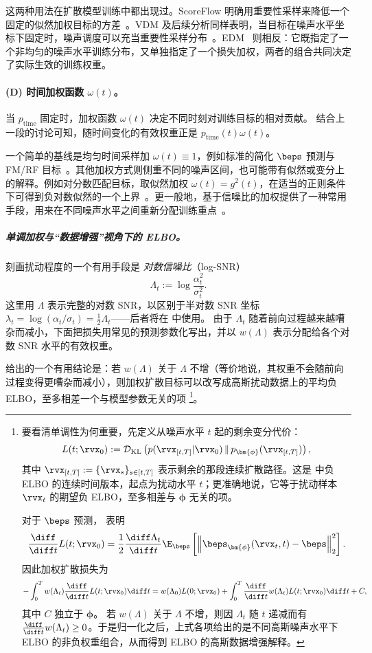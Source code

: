 这两种用法在扩散模型训练中都出现过。ScoreFlow 明确用重要性采样来降低一个固定的似然加权目标的方差~\citep{song2021maximum}。VDM 及后续分析同样表明，当目标在噪声水平坐标下固定时，噪声调度可以充当重要性采样分布~\citep{kingma2021variational,kingma2023understanding}。EDM~\citep{karras2022elucidating} 则相反：它既指定了一个非均匀的噪声水平训练分布，又单独指定了一个损失加权，两者的组合共同决定了实际生效的训练权重。

\paragraph{(D) 时间加权函数 $\omega(t)$。}
当 $p_{\text{time}}$ 固定时，加权函数 $\omega(t)$ 决定不同时刻对训练目标的相对贡献。
结合上一段的讨论可知，随时间变化的有效权重正是 $p_{\text{time}}(t)\omega(t)$。

一个简单的基线是均匀时间采样加 $\omega(t)\equiv1$，例如标准的简化 $\beps$ 预测与 FM/RF 目标~\citep{ho2020denoising,lipman2022flow,liu2022rectified}。其他加权方式则侧重不同的噪声区间，也可能带有似然或变分上的解释。例如对分数匹配目标，取似然加权 $\omega(t)=g^2(t)$，在适当的正则条件下可得到负对数似然的一个上界~\citep{song2021maximum}。更一般地，基于信噪比的加权提供了一种常用手段，用来在不同噪声水平之间重新分配训练重点~\citep{kingma2021variational,kingma2023understanding}。

\subparagraph{单调加权与“数据增强”视角下的 ELBO。}
刻画扰动程度的一个有用手段是
\emph{对数信噪比}（log-SNR）
\[
\Lambda_t
:=
\log\frac{\alpha_t^2}{\sigma_t^2}.
\]
这里用 $\Lambda$ 表示完整的对数 SNR，以区别于半对数 SNR 坐标
$\lambda_t=\log(\alpha_t/\sigma_t)=\tfrac12\Lambda_t$——后者将在  中使用。
由于 $\Lambda_t$ 随着前向过程越来越嘈杂而减小，下面把损失用常见的预测参数化写出，并以
$w(\Lambda)$ 表示分配给各个对数 SNR 水平的有效权重。

\citet{kingma2023understanding} 给出的一个有用结论是：若
$w(\Lambda)$ 关于 $\Lambda$ 不增（等价地说，其权重不会随前向过程变得更嘈杂而减小），则加权扩散目标可以改写成高斯扰动数据上的平均负 ELBO，至多相差一个与模型参数无关的项
\footnote{
要看清单调性为何重要，先定义从噪声水平 $t$ 起的剩余变分代价：
\[
L(t;\rvx_0)
:=
\mathcal{D}_{\mathrm{KL}}
\left(
p(\rvx_{[t,T]}|\rvx_0)
\,\Vert\,
p_{\bm{\phi}}(\rvx_{[t,T]})
\right),
\]
其中 $\rvx_{[t,T]}:=\{\rvx_s\}_{s\in[t,T]}$ 表示剩余的那段连续扩散路径。这是  中负 ELBO 的连续时间版本，起点为扰动水平 $t$；更准确地说，它等于扰动样本 $\rvx_t$ 的期望负 ELBO，至多相差与 $\bm{\phi}$ 无关的项。

对于 $\beps$ 预测，\citet{kingma2023understanding} 表明
\[
\frac{\diff}{\diff t}L(t;\rvx_0)
=
\frac{1}{2}\frac{\diff\Lambda_t}{\diff t}
\E_{\beps}
\left[
\left\|
\beps_{\bm{\phi}}(\rvx_t,t)-\beps
\right\|_2^2
\right].
\]
因此加权扩散损失为
\[
-\int_0^T
w(\Lambda_t)
\frac{\diff}{\diff t}L(t;\rvx_0)\diff t
=
w(\Lambda_0)L(0;\rvx_0)
+
\int_0^T
\frac{\diff}{\diff t}w(\Lambda_t)
L(t;\rvx_0)\diff t
+
C,
\]
其中 $C$ 独立于 $\bm{\phi}$。
若 $w(\Lambda)$ 关于 $\Lambda$ 不增，则因 $\Lambda_t$ 随
$t$ 递减而有 $\frac{\diff}{\diff t}w(\Lambda_t)\geq0$。于是归一化之后，上式各项给出的是不同高斯噪声水平下 ELBO 的非负权重组合，从而得到 ELBO 的高斯数据增强解释。
}。

